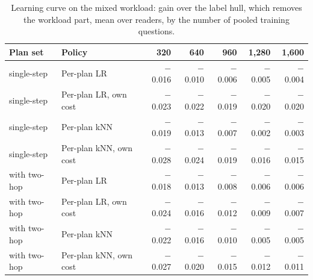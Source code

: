 \begin{table}[t]
\centering\small
\setlength{\tabcolsep}{4pt}
\caption{Learning curve on the mixed workload: gain over the label hull, which removes the workload part, mean over readers, by the number of pooled training questions.}
\label{tab:rev2_curve}
\begin{tabular*}{\linewidth}{@{\extracolsep{\fill}}llrrrrr}
\toprule
Plan set & Policy & 320 & 640 & 960 & 1,280 & 1,600 \\
\midrule
single-step & Per-plan LR & $-$0.016 & $-$0.010 & $-$0.006 & $-$0.005 & $-$0.004 \\
single-step & Per-plan LR, own cost & $-$0.023 & $-$0.022 & $-$0.019 & $-$0.020 & $-$0.020 \\
single-step & Per-plan kNN & $-$0.019 & $-$0.013 & $-$0.007 & $-$0.002 & $-$0.003 \\
single-step & Per-plan kNN, own cost & $-$0.028 & $-$0.024 & $-$0.019 & $-$0.016 & $-$0.015 \\
with two-hop & Per-plan LR & $-$0.018 & $-$0.013 & $-$0.008 & $-$0.006 & $-$0.006 \\
with two-hop & Per-plan LR, own cost & $-$0.024 & $-$0.016 & $-$0.012 & $-$0.009 & $-$0.007 \\
with two-hop & Per-plan kNN & $-$0.022 & $-$0.016 & $-$0.010 & $-$0.005 & $-$0.005 \\
with two-hop & Per-plan kNN, own cost & $-$0.027 & $-$0.020 & $-$0.015 & $-$0.012 & $-$0.011 \\
\bottomrule
\end{tabular*}
\end{table}
